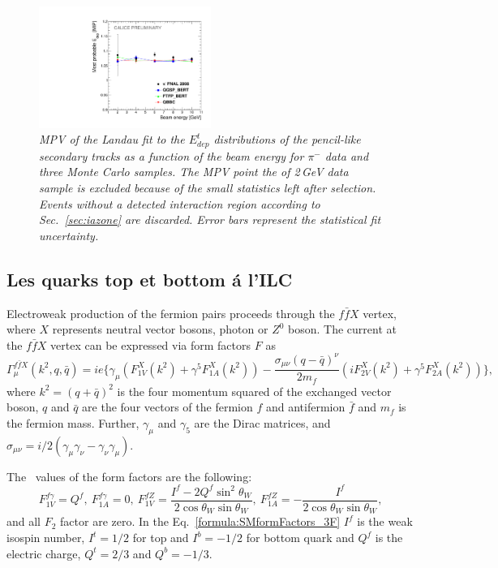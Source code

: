 \begin{figure}
	\centering
	\includegraphics[width=0.5\textwidth]{ECAL/plots/calibrationfit-graph.pdf}
	\caption{\label{fig:calibrationgraphF} \sl MPV of the Landau fit to the $E_{dep}^t$ distributions of the pencil-like secondary tracks as a function of the beam energy for $\pi^-$ data and three Monte Carlo samples. The MPV point the of 2\,GeV data sample is excluded because of the small statistics left after selection. Events without a detected interaction region  according to Sec.~\ref{sec:iazone} are discarded.  Error bars represent the statistical fit uncertainty.}
\end{figure}


\subsection*{Les quarks top et bottom \'a l'ILC}
Electroweak production of the fermion pairs proceeds through the $f\bar{f}X$ vertex, where $X$ represents neutral vector bosons, photon or $Z^0$ boson.  The current at the $f\bar{f}X$ vertex can be expressed via form factors $F$ as 
\begin{equation}
\Gamma^{f\bar{f}X}_\mu (k^2,q,\bar{q}) = ie\{ \gamma_\mu (F^X_{1V}(k^2) + \gamma^5 F^X_{1A}(k^2)) - \frac{\sigma_{\mu\nu}(q-\bar{q})^\nu}{2m_f}(iF^X_{2V}(k^2) + \gamma^5 F^X_{2A}(k^2)) \},
\end{equation}
where $k^2= (q+\bar{q})^2$ is the four momentum squared of the exchanged vector boson, $q$ and $\bar{q}$ are the four vectors of the fermion $f$ and antifermion $\bar{f}$ and $m_f$ is the fermion mass. Further, $\gamma_\mu$ and $\gamma_5$ are the Dirac matrices, and $\sigma_{\mu\nu} = i/2(\gamma_\mu\gamma_\nu - \gamma_\nu\gamma_\mu)$.

The \sm\ values of the form factors are the following:
\begin{equation}
F^{f\gamma}_{1V} = Q^{f}, \ F^{f\gamma}_{1A} = 0, \ F^{fZ}_{1V} = \frac{I^f - 2Q^f\sin^2\theta_W}{2\cos\theta_W\sin\theta_W}, \ F^{fZ}_{1A} = - \frac{I^f}{2\cos\theta_W\sin\theta_W},
\label{formula:SMformFactors_3F}
\end{equation}
and all $F_2$ factor are zero. In the Eq.~\ref{formula:SMformFactors_3F} $I^f$ is the weak isospin number, $I^t = 1/2$ for top and $I^b = -1/2$ for bottom quark and $Q^f$ is the electric charge, $Q^t = 2/3$ and $Q^b = -1/3$.

